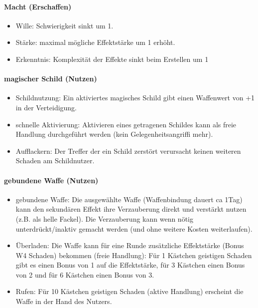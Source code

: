 \documentclass{article}
\begin{document}
\paragraph{Macht (Erschaffen)}

\begin{itemize}
\item Wille: Schwierigkeit sinkt um 1.
\item Stärke: maximal mögliche Effektstärke um 1 erhöht.
\item Erkenntnis: Komplexität der Effekte sinkt beim Erstellen um 1
\end{itemize}

\paragraph{magischer Schild (Nutzen)}

\begin{itemize}
\item Schildnutzung: Ein aktiviertes magisches Schild gibt einen Waffenwert von +1 in der Verteidigung.
\item schnelle Aktivierung: Aktivieren eines getragenen Schildes kann als freie Handlung durchgeführt werden (kein Gelegenheitsangriffi mehr).
\item Aufflackern: Der Treffer der ein Schild zerstört verursacht keinen weiteren Schaden am Schildnutzer.
\end{itemize}

\paragraph{gebundene Waffe (Nutzen)}

\begin{itemize}
\item gebundene Waffe: Die ausgewählte Waffe (Waffenbindung dauert ca 1Tag) kann den sekundären Effekt ihre Verzauberung direkt und verstärkt nutzen (z.B. als helle Fackel). Die Verzauberung kann wenn nötig unterdrückt/inaktiv gemacht werden (und ohne weitere Kosten weiterlaufen).
\item Überladen: Die Waffe kann für eine Runde zusätzliche Effektstärke (Bonus W4 Schaden) bekommen (freie Handlung): Für 1 Kästchen geistigen Schaden gibt es einen Bonus von 1 auf die Effektstärke, für 3 Kästchen einen Bonus von 2 und für 6 Kästchen einen Bonus von 3.
\item Rufen: Für 10 Kästchen geistigen Schaden (aktive Handlung) erscheint die Waffe in der Hand des Nutzers.
\end{itemize}
\end{document}
